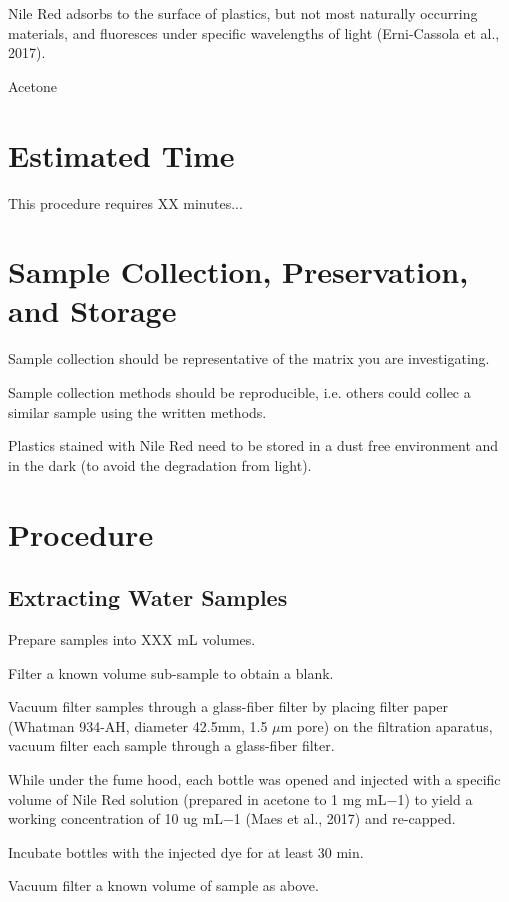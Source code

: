 \documentclass[12pt]{../SOP4_alpha}\usepackage[]{graphicx}\usepackage[]{color}
\begin{document}
\NP Nile Red adsorbs to the surface of plastics, but not most naturally occurring materials, and fluoresces under specific wavelengths of light (Erni-Cassola et al., 2017). 

\NP Acetone

\section{Estimated Time}

\NP This procedure requires XX minutes...

\section{Sample Collection, Preservation, and Storage}

\NP Sample collection should be representative of the matrix you are investigating. 

\NP Sample collection methods should be reproducible, i.e. others could collec a similar sample using the written methods. 

\NP Plastics stained with Nile Red need to be stored in a dust free environment and in the dark (to avoid the degradation from light).

\section{Procedure}

\subsection{Extracting Water Samples}

\NP Prepare samples into XXX mL volumes. 

\NP Filter a known volume sub-sample to obtain a blank.

\NP Vacuum filter samples through a glass-fiber filter by placing filter paper (Whatman 934-AH, diameter 42.5mm, 1.5 $\mu$m pore) on the filtration aparatus, vacuum filter each sample through a glass-fiber filter.

\NP While under the fume hood, each bottle was opened and injected with a specific volume of Nile Red solution (prepared in acetone to 1 mg mL−1) to yield a working concentration of 10 ug mL−1 (Maes et al., 2017) and re-capped. 

\NP Incubate bottles with the injected dye for at least 30 min. 

\NP Vacuum filter a known volume of sample as above. 
\end{document}
